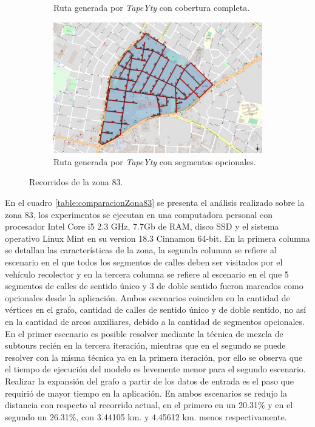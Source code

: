 \documentclass[spanish, conference]{IEEEtran}
\begin{document}
\begin{figure}[htbp]
\begin{subfigure}[b]{0.45\textwidth}
    \caption{Ruta generada por \textit{TapeYty} con cobertura completa.}
    \label{fig:RecorridoTapeYtyZona83}
  \end{subfigure}
  \begin{subfigure}[b]{1\textwidth}
        \includegraphics[width=\textwidth]{imagenes/recorrido83GeneradoNoHabilitados.png}
        \caption{Ruta generada por \textit{TapeYty} con segmentos opcionales.}
        \label{fig:RecorridoTapeYtyZona83Opcionales}
    \end{subfigure}
  \caption{Recorridos de la zona 83.}
\end{figure}

En el cuadro \ref{table:comparacionZona83} se presenta el análisis realizado sobre la zona 83, los experimentos se ejecutan en una computadora personal con procesador Intel\textcopyright{}  Core\texttrademark{} i5 2.3 GHz, 7.7Gb de RAM, disco SSD y el sistema operativo Linux Mint en su version 18.3 Cinnamon 64-bit. En la primera columna se detallan las características de la zona, la segunda columna se refiere al escenario en el que todos los segmentos de calles deben ser visitados por el vehículo recolector y en la tercera columna se refiere al escenario en el que 5 segmentos de calles de sentido único y 3 de doble sentido fueron marcados como opcionales desde la aplicación. Ambos escenarios coinciden en la cantidad de vértices en el grafo, cantidad de calles de sentido único y de doble sentido, no así en la cantidad de arcos auxiliares, debido a la cantidad de segmentos opcionales. En el primer escenario es posible resolver mediante la técnica de mezcla de subtours recién en la tercera iteración, mientras que en el segundo se puede resolver con la misma técnica ya en la primera iteración, por ello se observa que el tiempo de ejecución del modelo es levemente menor para el segundo escenario. Realizar la expansión del grafo a partir de los datos de entrada es el paso que requirió de mayor tiempo en la aplicación. En ambos escenarios se redujo la distancia con respecto al recorrido actual, en el primero en un 20.31\%  y en el segundo un 26.31\%, con 3.44105 km. y 4.45612 km. menos respectivamente.
\end{document}
